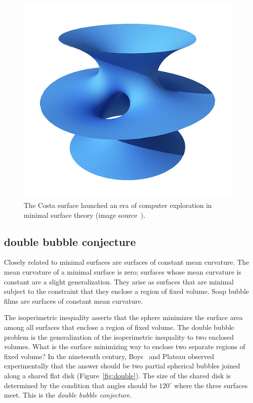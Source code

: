 \documentclass{llncs}
\begin{document}
\begin{figure}[h!]
  \centering
\includegraphics[scale=0.28]{costa_flikr_8059864268_401a0d7e13_d.jpg}
  \caption{The Costa surface launched an era of computer exploration
in minimal surface theory (image source~\cite{costa}).}
\label{fig:costa}
\end{figure}



\subsection{double bubble conjecture}

Closely related to minimal surfaces are surfaces of constant mean
curvature.  The mean curvature of a minimal surface is zero; surfaces
whose mean curvature is constant are a slight generalization.  They
arise as surfaces that are minimal subject to the constraint that
they enclose a region of fixed volume.  Soap bubble films are
surfaces of constant mean curvature.  

The isoperimetric inequality asserts that the sphere minimizes the
surface area among all surfaces that enclose a region of fixed volume.
The double bubble problem is the generalization of the isoperimetric
inequality to two enclosed volumes.  What is the surface minimizing
way to enclose two separate regions of fixed volume?  In the
nineteenth century, Boys~\cite{Boy1890} and Plateau observed
experimentally that the answer should be two partial spherical bubbles
joined along a shared flat disk (Figure~\ref{fig:double}).  The size
of the shared disk is determined by the condition that angles should
be $120^\circ$ where the three surfaces meet.  This is the {\it double
  bubble conjecture}.
\end{document}
